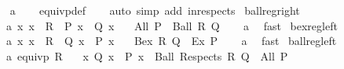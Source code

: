 \begin{isabellebody}
%
\isadelimproof
\ \ %
\endisadelimproof
%
\isatagproof
{}\isamarkupfalse%
\ a\isanewline
\ \ \isamarkupfalse%
\ equivp{\isacharunderscore}{\kern0pt}def\isanewline
\ \ \isamarkupfalse%
\ {\isacharparenleft}{\kern0pt}auto\ simp\ add{\isacharcolon}{\kern0pt}\ in{\isacharunderscore}{\kern0pt}respects{\isacharparenright}{\kern0pt}%
\endisatagproof
{\isafoldproof}%
%
\isadelimproof
\isanewline
%
\endisadelimproof
\isanewline
{}\isamarkupfalse%
\ ball{\isacharunderscore}{\kern0pt}reg{\isacharunderscore}{\kern0pt}right{\isacharcolon}{\kern0pt}\isanewline
\ \ \ a{\isacharcolon}{\kern0pt}\ {\isachardoublequoteopen}{\isasymAnd}x{\isachardot}{\kern0pt}\ x\ {\isasymin}\ R\ {\isasymLongrightarrow}\ P\ x\ {\isasymlongrightarrow}\ Q\ x{\isachardoublequoteclose}\isanewline
\ \ \ {\isachardoublequoteopen}All\ P\ {\isasymlongrightarrow}\ Ball\ R\ Q{\isachardoublequoteclose}\isanewline
%
\isadelimproof
\ \ %
\endisadelimproof
%
\isatagproof
{}\isamarkupfalse%
\ a\ \isamarkupfalse%
\ fast%
\endisatagproof
{\isafoldproof}%
%
\isadelimproof
\isanewline
%
\endisadelimproof
\isanewline
{}\isamarkupfalse%
\ bex{\isacharunderscore}{\kern0pt}reg{\isacharunderscore}{\kern0pt}left{\isacharcolon}{\kern0pt}\isanewline
\ \ \ a{\isacharcolon}{\kern0pt}\ {\isachardoublequoteopen}{\isasymAnd}x{\isachardot}{\kern0pt}\ x\ {\isasymin}\ R\ {\isasymLongrightarrow}\ Q\ x\ {\isasymlongrightarrow}\ P\ x{\isachardoublequoteclose}\isanewline
\ \ \ {\isachardoublequoteopen}Bex\ R\ Q\ {\isasymlongrightarrow}\ Ex\ P{\isachardoublequoteclose}\isanewline
%
\isadelimproof
\ \ %
\endisadelimproof
%
\isatagproof
{}\isamarkupfalse%
\ a\ \isamarkupfalse%
\ fast%
\endisatagproof
{\isafoldproof}%
%
\isadelimproof
\isanewline
%
\endisadelimproof
\isanewline
{}\isamarkupfalse%
\ ball{\isacharunderscore}{\kern0pt}reg{\isacharunderscore}{\kern0pt}left{\isacharcolon}{\kern0pt}\isanewline
\ \ \ a{\isacharcolon}{\kern0pt}\ {\isachardoublequoteopen}equivp\ R{\isachardoublequoteclose}\isanewline
\ \ \ {\isachardoublequoteopen}{\isacharparenleft}{\kern0pt}{\isasymAnd}x{\isachardot}{\kern0pt}\ {\isacharparenleft}{\kern0pt}Q\ x\ {\isasymlongrightarrow}\ P\ x{\isacharparenright}{\kern0pt}{\isacharparenright}{\kern0pt}\ {\isasymLongrightarrow}\ Ball\ {\isacharparenleft}{\kern0pt}Respects\ R{\isacharparenright}{\kern0pt}\ Q\ {\isasymlongrightarrow}\ All\ P{\isachardoublequoteclose}\isanewline

\end{isabellebody}
